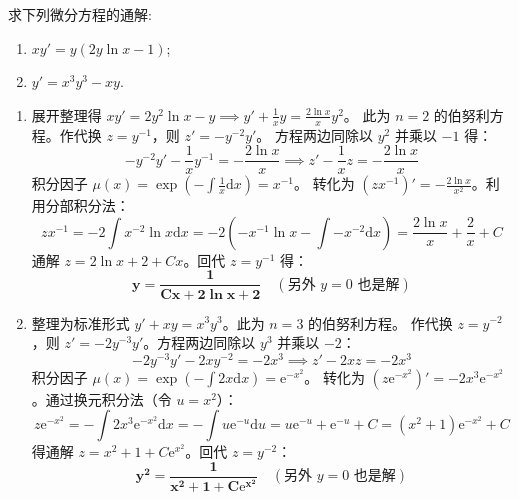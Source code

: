 \documentclass[lang=cn,11pt]{elegantbook}
\begin{document}
\begin{exercise}[一阶线性与伯努利方程求通解]
求下列微分方程的通解:
\begin{enumerate}
    \item[(1)] $\displaystyle xy' = y(2y\ln x - 1)$;
    \item[(2)] $\displaystyle y' = x^3y^3 - xy$.
\end{enumerate}
\end{exercise}
\begin{solution}
\begin{enumerate}
    \item[(1)] 展开整理得 $xy' = 2y^2\ln x - y \implies y' + \frac{1}{x}y = \frac{2\ln x}{x}y^2$。
此为 $n=2$ 的伯努利方程。作代换 $z = y^{-1}$，则 $z' = -y^{-2}y'$。
方程两边同除以 $y^2$ 并乘以 $-1$ 得：
\[
-y^{-2}y' - \frac{1}{x}y^{-1} = -\frac{2\ln x}{x} \implies z' - \frac{1}{x}z = -\frac{2\ln x}{x}
\]
积分因子 $\mu(x) = \exp\!\left(-\int \frac{1}{x}\mathrm{d}x\right) = x^{-1}$。
转化为 $(zx^{-1})' = -\frac{2\ln x}{x^2}$。利用分部积分法：
\[
zx^{-1} = -2\int x^{-2}\ln x\mathrm{d}x = -2\left(-x^{-1}\ln x - \int -x^{-2}\mathrm{d}x\right) = \frac{2\ln x}{x} + \frac{2}{x} + C
\]
通解 $z = 2\ln x + 2 + Cx$。回代 $z = y^{-1}$ 得：
\[
\mathbf{y = \frac{1}{Cx + 2\ln x + 2}} \quad (\text{另外 } y=0 \text{ 也是解})
\]
\item[(2)] 整理为标准形式 $y' + xy = x^3y^3$。此为 $n=3$ 的伯努利方程。
作代换 $z = y^{-2}$，则 $z' = -2y^{-3}y'$。方程两边同除以 $y^3$ 并乘以 $-2$：
\[
-2y^{-3}y' - 2xy^{-2} = -2x^3 \implies z' - 2xz = -2x^3
\]
积分因子 $\mu(x) = \exp\!\left(-\int 2x\mathrm{d}x\right) = \mathrm{e}^{-x^2}$。
转化为 $(z\mathrm{e}^{-x^2})' = -2x^3\mathrm{e}^{-x^2}$。通过换元积分法（令 $u = x^2$）：
\[
z\mathrm{e}^{-x^2} = -\int 2x^3\mathrm{e}^{-x^2}\mathrm{d}x = -\int u\mathrm{e}^{-u}\mathrm{d}u = u\mathrm{e}^{-u} + \mathrm{e}^{-u} + C = (x^2+1)\mathrm{e}^{-x^2} + C
\]
得通解 $z = x^2 + 1 + C\mathrm{e}^{x^2}$。回代 $z = y^{-2}$：
\[
\mathbf{y^2 = \frac{1}{x^2 + 1 + C\mathrm{e}^{x^2}}} \quad (\text{另外 } y=0 \text{ 也是解})
\]
\end{enumerate}
\end{solution}
\end{document}
